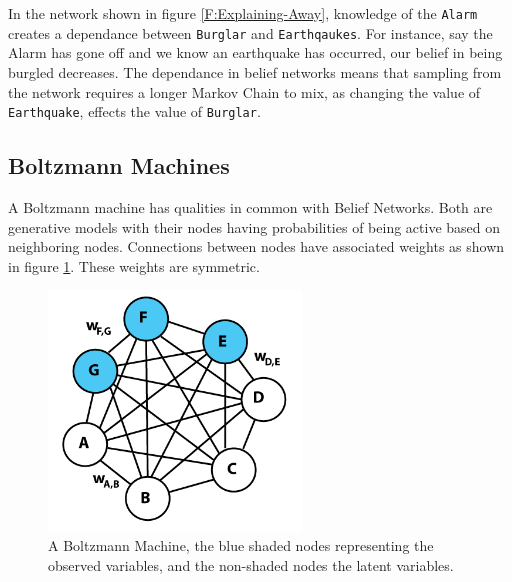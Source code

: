     In the network shown in figure \ref{F:Explaining-Away}, knowledge of the \texttt{Alarm} creates a dependance between \texttt{Burglar} and \texttt{Earthqaukes}. For instance, say the Alarm has gone off and we know an earthquake has occurred, our belief in being burgled decreases. The dependance in belief networks means that sampling from the network requires a longer Markov Chain to mix, as changing the value of \texttt{Earthquake}, effects the value of \texttt{Burglar}. 

  \subsection{Boltzmann Machines}

A Boltzmann machine   has qualities in common with Belief Networks. Both are generative models with their nodes having probabilities of being active based on neighboring nodes. Connections between nodes have associated weights as shown in figure \ref{F:Boltzmann-Machine}. These weights are symmetric.


  \begin{figure}[h]
  \begin{center}
    \includegraphics[width = 0.6\textwidth]{Assets/Boltzmann_Machine.png}
  \caption{A Boltzmann Machine, the blue shaded nodes representing the observed variables, and the non-shaded nodes the latent variables.}
  \label{F:Boltzmann-Machine}
  \end{center}
  \end{figure}

